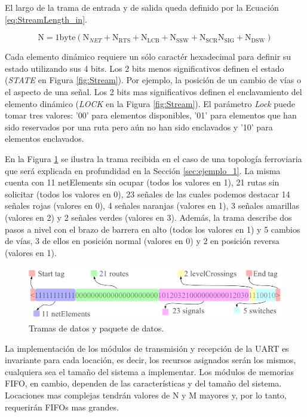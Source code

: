 	El largo de la trama de entrada y de salida queda definido por la Ecuación \ref{eq:StreamLength_in}.
	
	\begin{equation} 
		\label{eq:StreamLength_in}
		\text{N} = 1\text{byte} (\text{N}_{NET}+\text{N}_{\text{RTS}}+\text{N}_{\text{LCB}}+\text{N}_{\text{SSW}}+\text{N}_{\text{SCR}}\text{N}_{\text{SIG}}+\text{N}_{\text{DSW}})
	\end{equation}
	
	Cada elemento dinámico requiere un sólo caractér hexadecimal para definir su estado utilizando sus 4 bits. Los 2 bits menos significativos definen el estado (\textit{STATE} en Figura \ref{fig:Stream}). Por ejemplo, la posición de un cambio de vías o el aspecto de una señal. Los 2 bits mas significativos definen el enclavamiento del elemento dinámico (\textit{LOCK} en la Figura \ref{fig:Stream}). El parámetro \textit{Lock} puede tomar tres valores: '00' para elementos disponibles, '01' para elementos que han sido reservados por una ruta pero aún no han sido enclavados y '10' para elementos enclavados.
	
	En la Figura \ref{fig:Stream_ejemplo1} se ilustra la trama recibida en el caso de una topología ferroviaria que será explicada en profundidad en la Sección \ref{sec:ejemplo_1}. La misma cuenta con 11 netElements sin ocupar (todos los valores en 1), 21 rutas sin solicitar (todos los valores en 0), 23 señales de las cuales podemos destacar 14 señales rojas (valores en 0), 4 señales naranjas (valores en 1), 3 señales amarillas (valores en 2) y 2 señales verdes (valores en 3). Además, la trama describe dos pasos a nivel con el brazo de barrera en alto (todos los valores en 1) y 5 cambios de vías, 3 de ellos en posición normal (valores en 0) y 2 en posición reversa (valores en 1).	
	
	\begin{figure}[H]
		\centering
		\includegraphics[width=1\textwidth]{Figuras/Trama_ejemplo.jpg}
		\centering\caption{Tramas de datos y paquete de datos.}
		\label{fig:Stream_ejemplo1}
	\end{figure}

	La implementación de los módulos de transmisión y recepción de la UART es invariante para cada locación, es decir, los recursos asignados serán los mismos, cualquiera sea el tamaño del sistema a implementar. Los módulos de memorias FIFO, en cambio, dependen de las características y del tamaño del sistema. Locaciones mas complejas tendrán valores de N y M mayores y, por lo tanto, requerirán FIFOs mas grandes. 
	
